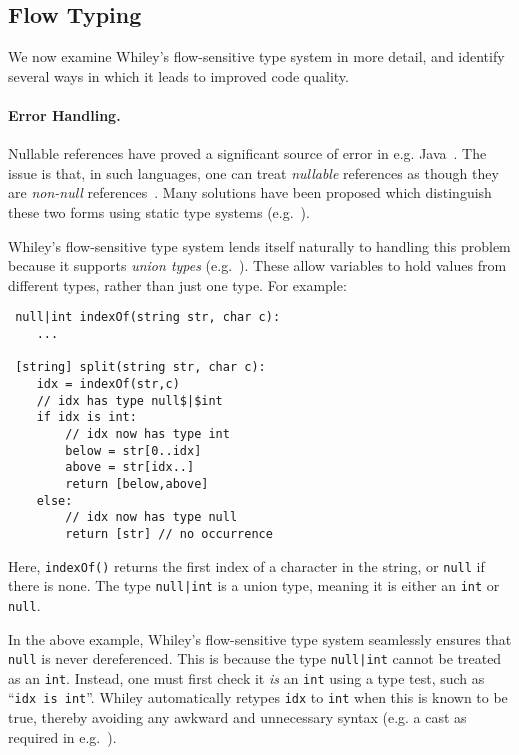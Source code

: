 \subsection{Flow Typing}
We now examine Whiley's flow-sensitive type system in more detail, and
 identify several ways in which it leads to improved code quality.

\paragraph{Error Handling.}
Nullable references have proved a significant source of error in
e.g. Java~\cite{Hoa09}.  The issue is that, in such
languages, one can treat {\em nullable} references as though they are
{\em non-null} references~\cite{Pier02}.  Many solutions have been
proposed which distinguish these two forms using static type
systems (e.g.~\cite{PQVHV01,FL03,KH07,CFJJ06,CJ07,MPPD08,Hub08,HJP08}).

Whiley's flow-sensitive type system lends itself naturally to handling
this problem because it supports {\em union types}
(e.g.~\cite{BC91,IN07}).  These allow variables to hold values from
different types, rather than just one type.  For example:

\begin{lstlisting}
 null|int indexOf(string str, char c):
    ...

 [string] split(string str, char c):
    idx = indexOf(str,c)
    // idx has type null$|$int
    if idx is int:
        // idx now has type int
        below = str[0..idx]
        above = str[idx..]
        return [below,above]
    else:
        // idx now has type null
        return [str] // no occurrence
\end{lstlisting}
Here, \lstinline{indexOf()} returns the first index of a character in
the string, or \lstinline{null} if there is none.  The type
\lstinline{null|int} is a union type, meaning it is either an
\lstinline{int} or \lstinline{null}.

In the above example, Whiley's flow-sensitive type system seamlessly
ensures that \lstinline{null} is never dereferenced.  This is because
the type \lstinline{null|int} cannot be treated as an \lstinline{int}.
Instead, one must first check it {\em is} an \lstinline{int} using a
type test, such as ``\lstinline{idx is int}''.  Whiley automatically
retypes \lstinline{idx} to \lstinline{int} when this is known to be
true, thereby avoiding any awkward and unnecessary syntax (e.g. a cast
as required in e.g.~\cite{ANMM06,MPPD08}).
